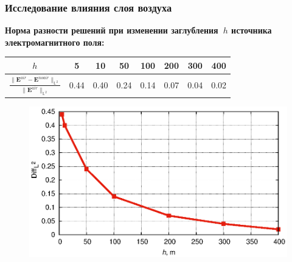 \documentclass[aspectratio=43,usepdftitle=false]{beamer}
\newcommand{\MakeTitle}[1]{\frametitle{\hspace{1.5em}\textbf{#1} \hfill \insertframenumber{} }}
\begin{document}

\begin{frame}
	\MakeTitle{Исследование влияния слоя воздуха}
	\textbf{Норма разности решений при изменении заглубления~$h$ источника электромагнитного поля:}
	\begin{small}
	\begin{table}[ht]
		\begin{tabularx}{\textwidth}{|C{2.89}|C{0.73}|C{0.73}|C{0.73}|C{0.73}|C{0.73}|C{0.73}|C{0.73}|}
			\hline $h$ & 5 & 10 & 50 & 100 & 200 & 300 & 400 \\
			\hline $\displaystyle \frac{\| \mathbf{E}^{air} - \mathbf{E}^{noair} \|_{\mathbb{L}^2}}{\| \mathbf{E}^{air} \|_{\mathbb{L}^2}}$ & 0.44 & 0.40 & 0.24 & 0.14 & 0.07 & 0.04 & 0.02 \\
			\hline
		\end{tabularx}
	\end{table}
	\end{small}
	\vspace{-1em}
	\begin{figure}[ht]
		\includegraphics[scale=0.7]{presentation.eps}
	\label{fig:res1:graph}
	\end{figure}
\end{frame}

\end{document}
